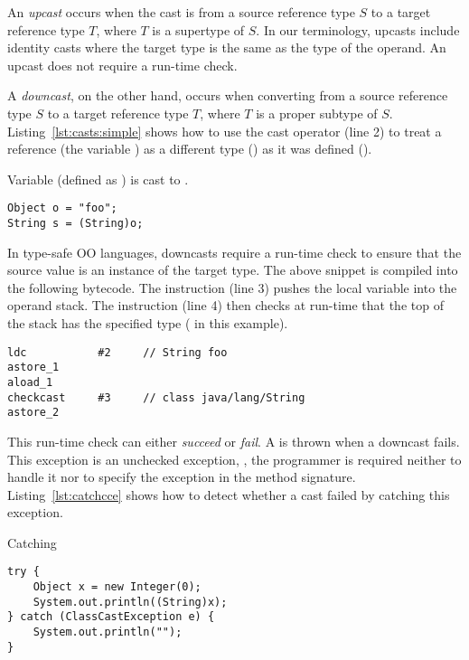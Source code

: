 An \emph{upcast} occurs when the cast is from a source reference type $S$ to a target reference type $T$,
where $T$ is a supertype of $S$.
In our terminology, upcasts include identity casts where the target type
is the same as the type of the operand.
An upcast does not require a run-time check.

A \emph{downcast}, on the other hand,
occurs when converting from a source reference type $S$ to a target reference
type $T$, where $T$ is a proper subtype of $S$.
Listing~\ref{lst:casts:simple} shows how to use the cast operator (line 2) to treat a reference (the variable ) as a different type () as it was defined ().

\begin{listing}
\caption{Variable  (defined as ) is cast to .}
\label{lst:casts:simple}
\begin{verbatim}
Object o = "foo"; 
String s = (String)o;
\end{verbatim}
\end{listing}

In type-safe OO languages, downcasts require
a run-time check to ensure that the source value is an instance of the target type.
The above snippet is compiled into the following \java{} bytecode.
The  instruction (line 3) pushes the local variable  into the operand stack.
The  instruction (line 4) then checks at run-time that the top of the stack has the specified type ( in this example).

\begin{lstlisting}[style=bytecode]
ldc           #2     // String foo
astore_1
aload_1
checkcast     #3     // class java/lang/String
astore_2
\end{lstlisting}


This run-time check can either \emph{succeed} or \emph{fail}.
A  is thrown when a downcast fails.
This exception is an unchecked exception, \ie,
the programmer is required neither to handle it
nor to specify the exception in the method signature.
Listing~\ref{lst:catchcce} shows how to detect whether a cast failed by catching this exception.

\begin{listing}
\caption{Catching }
\label{lst:catchcce}
\begin{verbatim}	
try {
	Object x = new Integer(0);
	System.out.println((String)x); 
} catch (ClassCastException e) { 
	System.out.println(""); 
}
\end{verbatim}
\end{listing}


